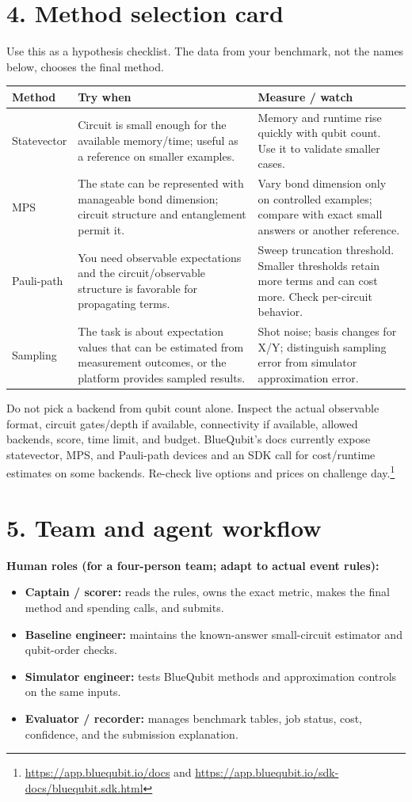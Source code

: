 \documentclass[11pt,letterpaper]{article}
\begin{document}
\section*{4. Method selection card}
Use this as a hypothesis checklist. The data from your benchmark, not the names below, chooses the final method.
\begin{tabularx}{\linewidth}{@{}p{1.22in}X X@{}}
\toprule
\textbf{Method} & \textbf{Try when} & \textbf{Measure / watch}\\
\midrule
Statevector & Circuit is small enough for the available memory/time; useful as a reference on smaller examples. & Memory and runtime rise quickly with qubit count. Use it to validate smaller cases.\\
MPS & The state can be represented with manageable bond dimension; circuit structure and entanglement permit it. & Vary bond dimension only on controlled examples; compare with exact small answers or another reference.\\
Pauli-path & You need observable expectations and the circuit/observable structure is favorable for propagating terms. & Sweep truncation threshold. Smaller thresholds retain more terms and can cost more. Check per-circuit behavior.\\
Sampling & The task is about expectation values that can be estimated from measurement outcomes, or the platform provides sampled results. & Shot noise; basis changes for X/Y; distinguish sampling error from simulator approximation error.\\
\bottomrule
\end{tabularx}

Do not pick a backend from qubit count alone. Inspect the actual observable format, circuit gates/depth if available, connectivity if available, allowed backends, score, time limit, and budget. BlueQubit's docs currently expose statevector, MPS, and Pauli-path devices and an SDK call for cost/runtime estimates on some backends. Re-check live options and prices on challenge day.\footnote{\url{https://app.bluequbit.io/docs} and \url{https://app.bluequbit.io/sdk-docs/bluequbit.sdk.html}}

\section*{5. Team and agent workflow}
\textbf{Human roles (for a four-person team; adapt to actual event rules):}
\begin{itemize}
  \item \textbf{Captain / scorer:} reads the rules, owns the exact metric, makes the final method and spending calls, and submits.
  \item \textbf{Baseline engineer:} maintains the known-answer small-circuit estimator and qubit-order checks.
  \item \textbf{Simulator engineer:} tests BlueQubit methods and approximation controls on the same inputs.
  \item \textbf{Evaluator / recorder:} manages benchmark tables, job status, cost, confidence, and the submission explanation.
\end{itemize}
\end{document}
